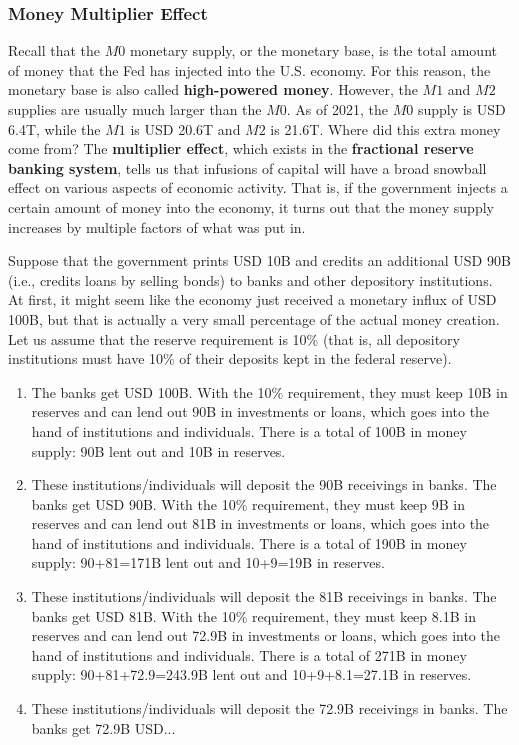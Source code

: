 \documentclass{article}
\begin{document}
    \subsubsection{Money Multiplier Effect}

      Recall that the $M0$ monetary supply, or the monetary base, is the total amount of money that the Fed has injected into the U.S. economy. For this reason, the monetary base is also called \textbf{high-powered money}. However, the $M1$ and $M2$ supplies are usually much larger than the $M0$. As of 2021, the $M0$ supply is USD 6.4T, while the $M1$ is USD 20.6T and $M2$ is 21.6T. Where did this extra money come from? The \textbf{multiplier effect}, which exists in the \textbf{fractional reserve banking system}, tells us that infusions of capital will have a broad snowball effect on various aspects of economic activity. That is, if the government injects a certain amount of money into the economy, it turns out that the money supply increases by multiple factors of what was put in.

      Suppose that the government prints USD 10B and credits an additional USD 90B (i.e., credits loans by selling bonds) to banks and other depository institutions. At first, it might seem like the economy just received a monetary influx of USD 100B, but that is actually a very small percentage of the actual money creation. Let us assume that the reserve requirement is 10\% (that is, all depository institutions must have 10\% of their deposits kept in the federal reserve).

      \begin{enumerate}
        \item The banks get USD 100B. With the 10\% requirement, they must keep 10B in reserves and can lend out 90B in investments or loans, which goes into the hand of institutions and individuals. There is a total of 100B in money supply: 90B lent out and 10B in reserves.
        \item These institutions/individuals will deposit the 90B receivings in banks. The banks get USD 90B. With the 10\% requirement, they must keep 9B in reserves and can lend out 81B in investments or loans, which goes into the hand of institutions and individuals. There is a total of 190B in money supply: 90+81=171B lent out and 10+9=19B in reserves.
        \item These institutions/individuals will deposit the 81B receivings in banks. The banks get USD 81B. With the 10\% requirement, they must keep 8.1B in reserves and can lend out 72.9B in investments or loans, which goes into the hand of institutions and individuals. There is a total of 271B in money supply: 90+81+72.9=243.9B lent out and 10+9+8.1=27.1B in reserves.
        \item These institutions/individuals will deposit the 72.9B receivings in banks. The banks get 72.9B USD...
      \end{enumerate}
\end{document}
